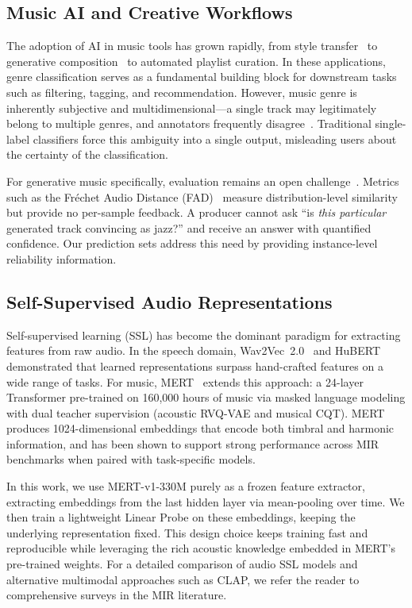 \subsection{Music AI and Creative Workflows}

The adoption of AI in music tools has grown rapidly, from style
transfer~\cite{huang2020creative} to generative composition~\cite{copet2023musicgen}
to automated playlist curation. In these applications, genre classification
serves as a fundamental building block for downstream tasks such as filtering,
tagging, and recommendation. However, music genre is inherently subjective and
multidimensional---a single track may legitimately belong to multiple genres,
and annotators frequently disagree~\cite{tzanetakis2002gtzan}. Traditional
single-label classifiers force this ambiguity into a single output, misleading
users about the certainty of the classification.

For generative music specifically, evaluation remains an open
challenge~\cite{yang2018evaluation}. Metrics such as the Fr\'{e}chet Audio
Distance (FAD)~\cite{kilgour2019fad} measure distribution-level similarity but
provide no per-sample feedback. A producer cannot ask ``is \emph{this
particular} generated track convincing as jazz?'' and receive an answer with
quantified confidence. Our prediction sets address this need by providing
instance-level reliability information.

\subsection{Self-Supervised Audio Representations}

Self-supervised learning (SSL) has become the dominant paradigm for extracting
features from raw audio. In the speech domain, Wav2Vec~2.0~\cite{baevski2020wav2vec2}
and HuBERT~\cite{hsu2021hubert} demonstrated that learned representations
surpass hand-crafted features on a wide range of tasks. For music,
MERT~\cite{li2023mert} extends this approach: a 24-layer Transformer
pre-trained on 160,000 hours of music via masked language modeling with dual
teacher supervision (acoustic RVQ-VAE and musical CQT). MERT produces
1024-dimensional embeddings that encode both timbral and harmonic information,
and has been shown to support strong performance across MIR benchmarks when
paired with task-specific models.

In this work, we use MERT-v1-330M purely as a frozen feature extractor,
extracting embeddings from the last hidden layer via mean-pooling over time. We
then train a lightweight Linear Probe on these embeddings, keeping the
underlying representation fixed. This design choice keeps training fast and
reproducible while leveraging the rich acoustic knowledge embedded in MERT's
pre-trained weights. For a detailed comparison of audio SSL models and
alternative multimodal approaches such as CLAP, we refer the reader to
comprehensive surveys in the MIR literature.

